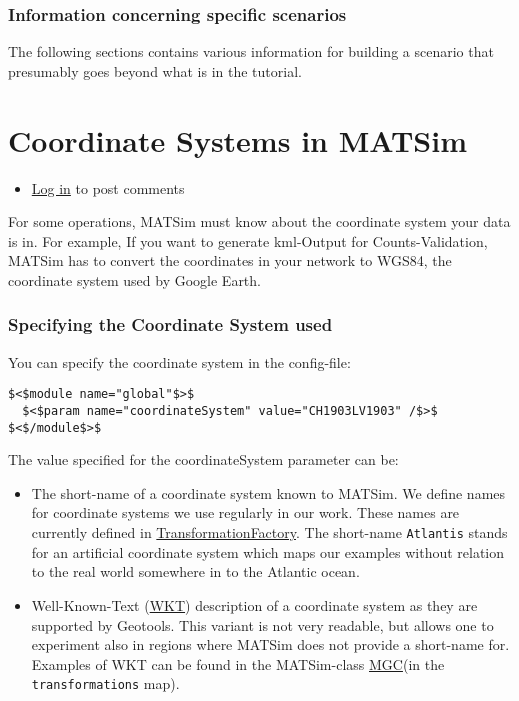 \documentclass[a4paper,11pt]{report}
\begin{document}
\subsubsection{Information concerning specific scenarios}

The following sections contains various information for building a scenario that presumably goes beyond what is in the tutorial.

\vfill\eject
\section{Coordinate Systems in MATSim}
\begin{itemize}
	\item \href{http://www.matsim.org/user/login?destination=comment/reply/405%23comment-form}{Log in} to post comments
\end{itemize}

For  some operations, MATSim must know about the coordinate system your data  is in. For example, If you want to generate kml-Output for  Counts-Validation, MATSim has to convert the coordinates in your network  to WGS84, the coordinate system used by Google Earth.


\subsubsection{Specifying the Coordinate System used}

You can specify the coordinate system in the config-file:
\begin{verbatim}
$<$module name="global"$>$
  $<$param name="coordinateSystem" value="CH1903LV1903" /$>$
$<$/module$>$
\end{verbatim}

The value specified for the coordinateSystem parameter can be:
\begin{itemize}
	\item The short-name of a coordinate system known to MATSim. We define  names for coordinate systems we use regularly in our work. These names  are currently defined in \href{http://matsim.svn.sourceforge.net/viewvc/matsim/matsim/trunk/src/main/java/org/matsim/core/utils/geometry/transformations/TransformationFactory.java?view=markup}{TransformationFactory}. The short-name 
\texttt{Atlantis}  stands for an artificial coordinate system which maps our examples  without relation to the real world somewhere in to the Atlantic ocean.
	\item Well-Known-Text (\href{http://www.geoapi.org/snapshot/javadoc/org/opengis/referencing/doc-files/WKT.html}{WKT})  description of a coordinate system as they are supported by Geotools.  This variant is not very readable, but allows one to experiment also in  regions where MATSim does not provide a short-name for. Examples of WKT  can be found in the MATSim-class \href{http://matsim.svn.sourceforge.net/viewvc/matsim/matsim/trunk/src/main/java/org/matsim/core/utils/geometry/geotools/MGC.java?view=markup}{MGC}(in the 
\texttt{transformations} map).
\end{itemize}
\end{document}
